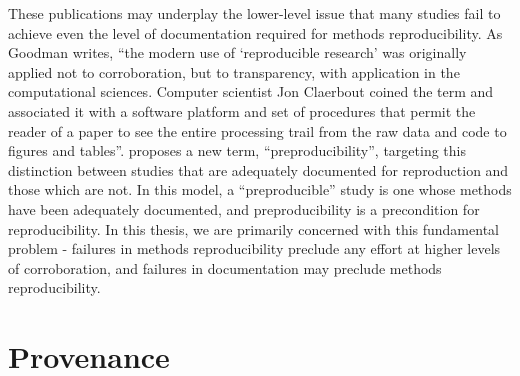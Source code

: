 These publications may underplay the lower-level issue that many studies
fail to achieve even the level of documentation required for methods
reproducibility. As Goodman writes, “the modern use of ‘reproducible research’
was originally applied not to corroboration, but to transparency, with
application in the computational sciences. Computer scientist Jon Claerbout
coined the term and associated it with a software platform and set of procedures
that permit the reader of a paper to see the entire processing trail from the
raw data and code to figures and tables”\parencite[1]{goodman_what_2016}.
\textcite{stark_before_2018} proposes a new term,
“preproducibility”, targeting this distinction between studies that are
adequately documented for reproduction and those which are not. In this
model, a “preproducible” study is one whose methods have been adequately
documented, and preproducibility is a precondition for reproducibility. In this
thesis, we are primarily concerned with this fundamental problem - failures in
methods reproducibility preclude any effort at higher levels of corroboration,
and failures in documentation may preclude methods reproducibility.

\section{Provenance}

